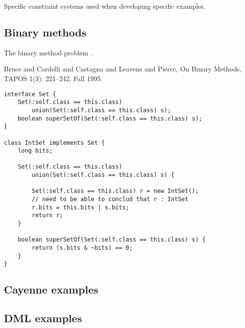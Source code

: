 %
%
%
%
%
%

Specific constraint systems used when developing specific
examples.

\subsection{Binary methods}

The binary method problem \cite{bruce}.

Bruce and Cardelli and Castagna and Leavens and Pierce,
On Binary Methods, TAPOS 1(3): 221--242, Fall 1995.

\begin{verbatim}
interface Set {
    Set(:self.class == this.class)
        union(Set(:self.class == this.class) s);
    boolean superSetOf(Set(:self.class == this.class) s);
}

class IntSet implements Set {
    long bits;

    Set(:self.class == this.class)
        union(Set(:self.class == this.class) s) {

        Set(:self.class == this.class) r = new IntSet();
        // need to be able to conclud that r : IntSet
        r.bits = this.bits | s.bits;
        return r;
    }

    boolean superSetOf(Set(:self.class == this.class) s) {
        return (s.bits & ~bits) == 0;
    }
}
\end{verbatim}

\subsection{Cayenne examples}





\subsection{DML examples}

